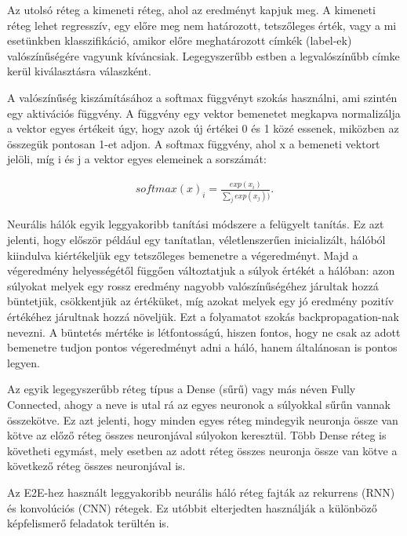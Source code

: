 Az utolsó réteg a kimeneti réteg, ahol az eredményt kapjuk meg. A kimeneti réteg lehet regresszív, egy előre meg nem határozott, tetszőleges érték, vagy a mi esetünkben klasszifikáció, amikor előre meghatározott címkék (label-ek) valószínűségére vagyunk kíváncsiak. Legegyszerűbb estben a legvalószínűbb címke kerül kiválasztásra válaszként.

A valószínűség kiszámításához a softmax \cite{softmax} függvényt szokás használni, ami szintén egy aktivációs függvény. A függvény egy vektor bemenetet megkapva normalizálja a vektor egyes értékeit úgy, hogy azok új értékei 0 és 1 közé essenek, miközben az összegük pontosan 1-et adjon. A softmax függvény, ahol x a bemeneti vektort jelöli, míg i és j a vektor egyes elemeinek a sorszámát:

\begin{align}
softmax(x)_i = \frac{exp(x_i)}{\sum_{j}^{ }exp(x_j))}.
\end{align}

Neurális hálók egyik leggyakoribb tanítási módszere a felügyelt tanítás. Ez azt jelenti, hogy először például egy tanítatlan, véletlenszerűen inicializált, hálóból kiindulva kiértékeljük egy tetszőleges bemenetre a végeredményt. Majd a végeredmény helyességétől függően változtatjuk a súlyok értékét a hálóban: azon súlyokat melyek egy rossz eredmény nagyobb valószínűségéhez járultak hozzá büntetjük, csökkentjük az értéküket, míg azokat melyek egy jó eredmény pozitív értékéhez járultnak hozzá növeljük. Ezt a folyamatot szokás backpropagation-nak nevezni. A büntetés mértéke is létfontosságú, hiszen fontos, hogy ne csak az adott bemenetre tudjon pontos végeredményt adni a háló, hanem általánosan is pontos legyen. 

Az egyik legegyszerűbb réteg típus a Dense (sűrű) vagy más néven Fully Connected, ahogy a neve is utal rá az egyes neuronok a súlyokkal sűrűn vannak összekötve. Ez azt jelenti, hogy minden egyes réteg mindegyik neuronja össze van kötve az előző réteg összes neuronjával súlyokon keresztül. Több Dense réteg is követheti egymást, mely esetben az adott réteg összes neuronja össze van kötve a következő réteg összes neuronjával is.

Az E2E-hez használt leggyakoribb neurális háló réteg fajták az rekurrens (RNN) és konvolúciós (CNN) rétegek. Ez utóbbit elterjedten használják a különböző képfelismerő feladatok terültén is.

